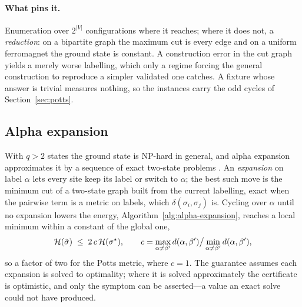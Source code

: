 \documentclass[11pt,a4paper]{article}
\begin{document}
\paragraph{What pins it.}
Enumeration over $2^{|V|}$ configurations where it reaches; where it does not,
a \emph{reduction}: on a bipartite graph the maximum cut is every edge and on a
uniform ferromagnet the ground state is constant. A construction error in the
cut graph yields a merely worse labelling, which only a regime forcing the
general construction to reproduce a simpler validated one catches. A fixture
whose answer is trivial measures nothing, so the instances carry the odd cycles
of Section~\ref{sec:potts}.

\subsection{Alpha expansion}
\label{sec:alpha-expansion}
With $q > 2$ states the ground state is NP-hard in general, and alpha
expansion approximates it by a sequence of exact two-state problems
\citep{boykov2001}. An \emph{expansion} on label $\alpha$ lets every site keep
its label or switch to $\alpha$; the best such move is the minimum cut of a
two-state graph built from the current labelling, exact when the pairwise term
is a metric on labels, which $\delta(\sigma_i, \sigma_j)$ is. Cycling over $\alpha$ until no expansion lowers the energy,
Algorithm~\ref{alg:alpha-expansion}, reaches a local minimum within a
constant of the global one,
\begin{equation}
  \mathcal{H}(\hat\sigma) \;\le\; 2\,c\,\mathcal{H}(\sigma^\star),
  \qquad
  c = \max_{\alpha \ne \beta'} d(\alpha, \beta') \big/ \min_{\alpha \ne \beta'} d(\alpha, \beta'),
  \label{eq:alpha-expansion}
\end{equation}
so a factor of two for the Potts metric, where $c = 1$. The guarantee assumes
each expansion is solved to optimality; where it is solved approximately the
certificate is optimistic, and only the symptom can be asserted---a value an
exact solve could not have produced.
\end{document}
